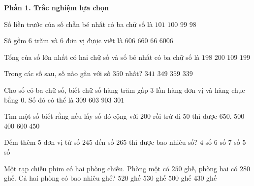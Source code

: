 \textbf{Phần 1. Trắc nghiệm lựa chọn}

\begin{ex} %
Số liền trước của số chẵn bé nhất có ba chữ số là
\choice
{$101$}
{$100$}
{\True $99$}
{$98$}
\end{ex}

\begin{ex} %
Số gồm $6$ trăm và $6$ đơn vị được viết là
\choice
{\True $606$}
{$660$}
{$66$}
{$6006$}
\end{ex}

\begin{ex} %
Tổng của số lớn nhất có hai chữ số và số bé nhất có ba chữ số là
\choice
{$198$}
{$200$}
{$109$}
{\True $199$}
\end{ex}

\begin{ex} %
Trong các số sau, số nào gần với số $350$ nhất?
\choice
{$341$}
{\True $349$}
{$359$}
{$339$}
\end{ex}

\begin{ex} %
Cho số có ba chữ số, biết chữ số hàng trăm gấp $3$ lần hàng đơn vị và hàng chục bằng $0$. Số đó có thể là
\choice
{$309$}
{$603$}
{\True $903$}
{$301$}
\end{ex}

\begin{ex} %
Tìm một số biết rằng nếu lấy số đó cộng với $200$ rồi trừ đi $50$ thì được $650$.
\choice
{\True $500$}
{$400$}
{$600$}
{$450$}
\end{ex}

\begin{ex} %
Đếm thêm $5$ đơn vị từ số $245$ đến số $265$ thì được bao nhiêu số?
\choice
{$4$ số}
{$6$ số}
{$7$ số}
{\True $5$ số}
\end{ex}

\begin{ex} %
Một rạp chiếu phim có hai phòng chiếu. Phòng một có $250$ ghế, phòng hai có $280$ ghế. Cả hai phòng có bao nhiêu ghế?
\choice
{$520$ ghế}
{\True $530$ ghế}
{$500$ ghế}
{$430$ ghế}
\end{ex}

